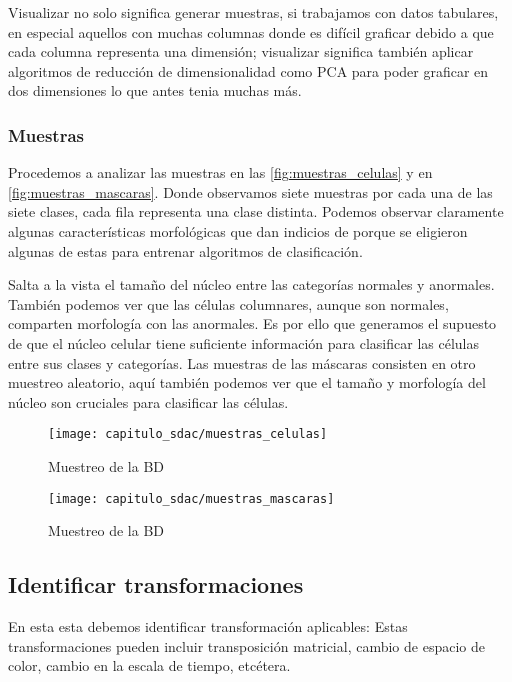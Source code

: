 Visualizar no solo significa generar muestras, si trabajamos con datos
tabulares, en especial aquellos con muchas columnas donde es difícil graficar
debido a que cada columna representa una dimensión; visualizar significa también
aplicar algoritmos de reducción de dimensionalidad como PCA para poder graficar
en dos dimensiones lo que antes tenia muchas más.

\subsubsection{Muestras}

Procedemos a analizar las muestras en las \autoref{fig:muestras_celulas} y en
\autoref{fig:muestras_mascaras}. Donde observamos siete muestras por cada una de
las siete clases, cada fila representa una clase distinta. Podemos observar
claramente algunas características morfológicas que dan indicios de porque se
eligieron algunas de estas para entrenar algoritmos de clasificación.

Salta a la vista el tamaño del núcleo entre las categorías normales y anormales.
También podemos ver que las células columnares, aunque son normales, comparten
morfología con las anormales. Es por ello que generamos el supuesto de que el
núcleo celular tiene suficiente información para clasificar las células entre
sus clases y categorías. Las muestras de las máscaras consisten en otro muestreo
aleatorio, aquí también podemos ver que el tamaño y morfología del núcleo son
cruciales para clasificar las células.

\begin{figure}[H]
    \centering
    \texttt{[image: capitulo\_sdac/muestras\_celulas]}
    \caption{Muestreo de la BD}\label{fig:muestras_celulas}
\end{figure}

\begin{figure}[H]
    \centering
    \texttt{[image: capitulo\_sdac/muestras\_mascaras]}
    \caption{Muestreo de la BD}\label{fig:muestras_mascaras}
\end{figure}

\subsection{Identificar transformaciones}

En esta esta debemos identificar transformación aplicables: Estas
transformaciones pueden incluir transposición matricial, cambio de espacio de
color, cambio en la escala de tiempo, etcétera.

